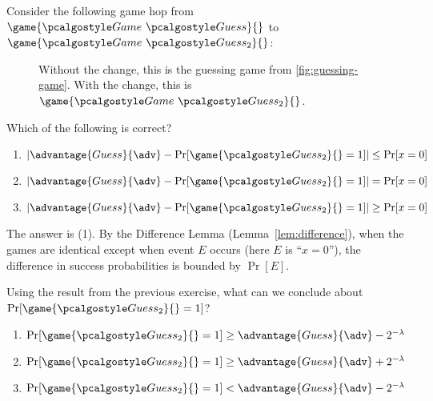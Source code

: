 \begin{exercise}
  Consider the following game hop from $\game{\Game~\algo{Guess}}{}$ to $\game{\Game~\algo{Guess}_2}{}$:
  
  \begin{figure}[h!]
    \begin{center}
      \begin{tcolorbox}[width=3cm]
        \begin{pchstack}[center]
        \end{pchstack}
      \end{tcolorbox}
    \end{center}
    \caption{Without the  change, this is the guessing game from \autoref{fig:guessing-game}. With the change, this is $\game{\Game~\algo{Guess}_2}{}$.}
  \end{figure}
  
  Which of the following is correct?
  \begin{enumerate}
    \item $|\advantage{Guess}{\adv} - \Pr[\game{\algo{Guess}_2}{} = 1]| \leq \Pr[x = 0]$
    \item $|\advantage{Guess}{\adv} - \Pr[\game{\algo{Guess}_2}{} = 1]| = \Pr[x = 0]$
    \item $|\advantage{Guess}{\adv} - \Pr[\game{\algo{Guess}_2}{} = 1]| \geq \Pr[x = 0]$
  \end{enumerate}
\end{exercise}

\ifsolutions
\begin{mysolution}
  The answer is (1).
  By the Difference Lemma (Lemma~\ref{lem:difference}), when the games are identical except when event $E$ occurs (here $E$ is ``$x = 0$''), the difference in success probabilities is bounded by $\Pr[E]$.
\end{mysolution}
\fi

\begin{exercise}
  Using the result from the previous exercise, what can we conclude about $\Pr[\game{\algo{Guess}_2}{} = 1]$?
  \begin{enumerate}
    \item $\Pr[\game{\algo{Guess}_2}{} = 1] \geq \advantage{Guess}{\adv} - 2^{-\lambda}$
    \item $\Pr[\game{\algo{Guess}_2}{} = 1] \geq \advantage{Guess}{\adv} + 2^{-\lambda}$
    \item $\Pr[\game{\algo{Guess}_2}{} = 1] < \advantage{Guess}{\adv} - 2^{-\lambda}$
  \end{enumerate}
\end{exercise}

